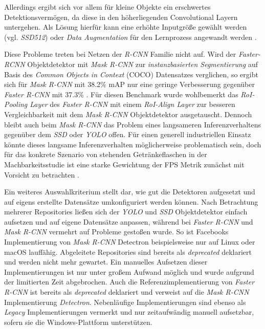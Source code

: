Allerdings ergibt sich vor allem für kleine Objekte ein erschwertes Detektionsvermögen, da diese in den höherliegenden Convolutional Layern untergehen. Als Lösung hierfür kann eine erhöhte Inputgröße gewählt werden (vgl. \textit{SSD512}) oder \textit{Data Augmentation} für den Lernprozess angewandt werden \cite{ssd.20161229}.

Diese Probleme treten bei Netzen der \textit{R-CNN} Familie nicht auf. Wird der \textit{Faster-RCNN} Objektdetektor mit \textit{Mask R-CNN} zur \textit{instanzbasierten Segmentierung} auf Basis des \textit{Common Objects in Context} (COCO) Datensatzes verglichen, so ergibt sich für \textit{Mask R-CNN} mit 38.2\% mAP nur eine geringe Verbesserung gegenüber \textit{Faster R-CNN} mit 37.3\% \cite{KaimingHeGeorgiaGkioxariPiotrDollarRossGirshick.20180224}. Für diesen Benchmark wurde wohlbemerkt das \textit{RoI-Pooling Layer} des \textit{Faster R-CNN} mit einem \textit{RoI-Align Layer} zur besseren Vergleichbarkeit mit dem \textit{Mask R-CNN} Objektdetektor ausgetauscht. Dennoch bleibt auch beim \textit{Mask R-CNN} das Problem eines langsameren Inferenzverhaltens gegenüber dem \textit{SSD} oder \textit{YOLO} offen. Für einen generell industriellen Einsatz könnte dieses langsame Inferenzverhalten möglicherweise problematisch sein, doch für das konkrete Szenario von stehenden Getränkeflaschen in der Machbarkeitsstudie ist eine starke Gewichtung der FPS Metrik zunächst mit Vorsicht zu betrachten \cite{IntanPurnamasar.20181215}. 

Ein weiteres Auswahlkriterium stellt dar, wie gut die Detektoren aufgesetzt und auf eigens erstellte Datensätze umkonfiguriert werden können. Nach Betrachtung mehrerer Repositories ließen sich der \textit{YOLO} und \textit{SSD} Objektdetektor einfach aufsetzen und auf eigene Datensätze anpassen, während bei \textit{Faster R-CNN} und \textit{Mask R-CNN} vermehrt auf Probleme gestoßen wurde. So ist Facebooks Implementierung von \textit{Mask R-CNN} \glqq Detectron\grqq{} beispielsweise nur auf Linux oder macOS lauffähig. Abgeleitete Repositories sind bereits als \textit{deprecated} deklariert und werden nicht mehr gewartet. Ein manuelles Aufsetzen dieser Implementierungen ist nur unter großem Aufwand möglich und wurde aufgrund der limitierten Zeit abgebrochen. Auch die Referenzimplementierung von \textit{Faster R-CNN} ist bereits als \textit{deprecated} deklariert und verweist auf die \textit{Mask R-CNN} Implementierung \textit{Detectron}. Nebenläufige Implementierungen sind ebenso als \textit{Legacy} Implementierungen vermerkt und nur zeitaufwändig manuell aufsetzbar, sofern sie die Windows-Plattform unterstützen.


